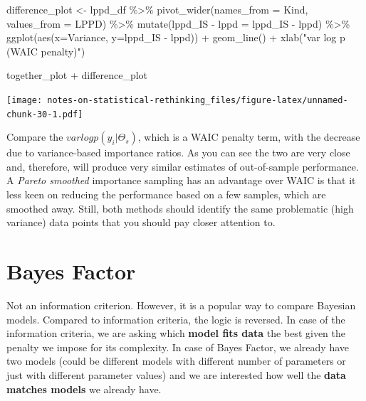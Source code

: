 \documentclass[
]{book}
\newenvironment{Shaded}{\begin{snugshade}}{\end{snugshade}}
\newcommand{\AttributeTok}[1]{\textcolor[rgb]{0.77,0.63,0.00}{#1}}
\newcommand{\FunctionTok}[1]{\textcolor[rgb]{0.00,0.00,0.00}{#1}}
\newcommand{\NormalTok}[1]{#1}
\newcommand{\OtherTok}[1]{\textcolor[rgb]{0.56,0.35,0.01}{#1}}
\newcommand{\SpecialCharTok}[1]{\textcolor[rgb]{0.00,0.00,0.00}{#1}}
\newcommand{\StringTok}[1]{\textcolor[rgb]{0.31,0.60,0.02}{#1}}
\begin{document}
\begin{Shaded}
\begin{Highlighting}[]
\NormalTok{difference\_plot }\OtherTok{\textless{}{-}}
\NormalTok{  lppd\_df }\SpecialCharTok{\%\textgreater{}\%}
  \FunctionTok{pivot\_wider}\NormalTok{(}\AttributeTok{names\_from =}\NormalTok{ Kind, }\AttributeTok{values\_from =}\NormalTok{ LPPD) }\SpecialCharTok{\%\textgreater{}\%}
  \FunctionTok{mutate}\NormalTok{(}\StringTok{\textasciigrave{}}\AttributeTok{lppd\_IS {-} lppd}\StringTok{\textasciigrave{}} \OtherTok{=}\NormalTok{ lppd\_IS }\SpecialCharTok{{-}}\NormalTok{ lppd) }\SpecialCharTok{\%\textgreater{}\%}
  \FunctionTok{ggplot}\NormalTok{(}\FunctionTok{aes}\NormalTok{(}\AttributeTok{x=}\NormalTok{Variance, }\AttributeTok{y=}\StringTok{\textasciigrave{}}\AttributeTok{lppd\_IS {-} lppd}\StringTok{\textasciigrave{}}\NormalTok{)) }\SpecialCharTok{+} 
  \FunctionTok{geom\_line}\NormalTok{() }\SpecialCharTok{+}
  \FunctionTok{xlab}\NormalTok{(}\StringTok{"var log p (WAIC penalty)"}\NormalTok{)}

\NormalTok{together\_plot }\SpecialCharTok{+}\NormalTok{ difference\_plot}
\end{Highlighting}
\end{Shaded}

\texttt{[image: notes-on-statistical-rethinking\_files/figure-latex/unnamed-chunk-30-1.pdf]}

Compare the \(var log p(y_i|\Theta_s)\), which is a WAIC penalty term, with the decrease due to variance-based importance ratios. As you can see the two are very close and, therefore, will produce very similar estimates of out-of-sample performance. A \emph{Pareto smoothed} importance sampling has an advantage over WAIC is that it less keen on reducing the performance based on a few samples, which are smoothed away. Still, both methods should identify the same problematic (high variance) data points that you should pay closer attention to.

\hypertarget{bayes-factor}{%
\section{Bayes Factor}\label{bayes-factor}}

Not an information criterion. However, it is a popular way to compare Bayesian models. Compared to information criteria, the logic is reversed. In case of the information criteria, we are asking which \textbf{model fits data} the best given the penalty we impose for its complexity. In case of Bayes Factor, we already have two models (could be different models with different number of parameters or just with different parameter values) and we are interested how well the \textbf{data matches models} we already have.
\end{document}
